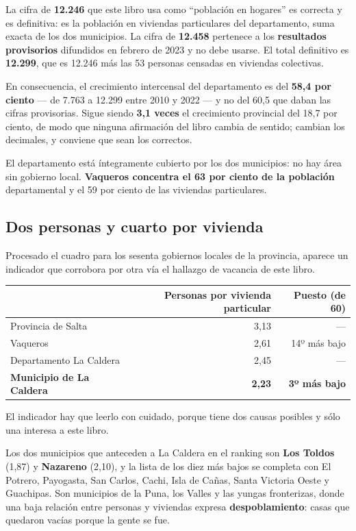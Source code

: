 \begin{cautela}
La cifra de \textbf{12.246} que este libro usa como ``población en hogares'' es correcta y es definitiva: es la población en viviendas particulares del departamento, suma exacta de los dos municipios. La cifra de \textbf{12.458} pertenece a los \textbf{resultados provisorios} difundidos en febrero de 2023 y no debe usarse. El total definitivo es \textbf{12.299}, que es 12.246 más las 53 personas censadas en viviendas colectivas.

En consecuencia, el crecimiento intercensal del departamento es del \textbf{58,4 por ciento} --- de 7.763 a 12.299 entre 2010 y 2022 --- y no del 60,5 que daban las cifras provisorias. Sigue siendo \textbf{3,1 veces} el crecimiento provincial del 18,7 por ciento, de modo que ninguna afirmación del libro cambia de sentido; cambian los decimales, y conviene que sean los correctos.

El departamento está íntegramente cubierto por los dos municipios: no hay área sin gobierno local. \textbf{Vaqueros concentra el 63 por ciento de la población} departamental y el 59 por ciento de las viviendas particulares.
\end{cautela}

\subsection*{Dos personas y cuarto por vivienda}

Procesado el cuadro para los sesenta gobiernos locales de la provincia, aparece un indicador que corrobora por otra vía el hallazgo de vacancia de este libro.

{\small
\begin{longtable}{@{}lrr@{}}
\toprule
& \textbf{Personas por vivienda particular} & \textbf{Puesto (de 60)} \\
\midrule
\endhead
Provincia de Salta & 3,13 & --- \\
Vaqueros & 2,61 & 14º más bajo \\
Departamento La Caldera & 2,45 & --- \\
\textbf{Municipio de La Caldera} & \textbf{2,23} & \textbf{3º más bajo} \\
\bottomrule
\end{longtable}}

El indicador hay que leerlo con cuidado, porque tiene dos causas posibles y sólo una interesa a este libro.

Los dos municipios que anteceden a La Caldera en el ranking son \textbf{Los Toldos} (1,87) y \textbf{Nazareno} (2,10), y la lista de los diez más bajos se completa con El Potrero, Payogasta, San Carlos, Cachi, Isla de Cañas, Santa Victoria Oeste y Guachipas. Son municipios de la Puna, los Valles y las yungas fronterizas, donde una baja relación entre personas y viviendas expresa \textbf{despoblamiento}: casas que quedaron vacías porque la gente se fue.

